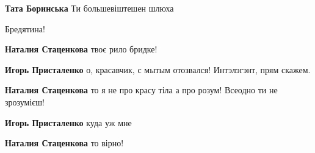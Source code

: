 \begin{itemize}
\begin{itemize}
\textbf{Тата Боринська} Ти большевіштешен шлюха

\end{itemize}

 
Бредятина!

\begin{itemize}
 
\textbf{Наталия Стаценкова} твоє рило бридке!

 
\textbf{Игорь Присталенко} о, красавчик, с мытым отозвался! Интэлэгэнт, прям скажем.

 
\textbf{Наталия Стаценкова} то я не про красу тіла а про розум! Всеодно ти не зрозумієш!

 
\textbf{Игорь Присталенко} куда уж мне🤣

 
\textbf{Наталия Стаценкова} то вірно!


\end{itemize}
\end{itemize}
